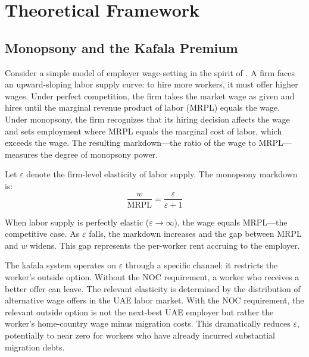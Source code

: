 \documentclass[12pt]{article}
\begin{document}

\section{Theoretical Framework}\label{sec:theory}

\subsection{Monopsony and the Kafala Premium}

Consider a simple model of employer wage-setting in the spirit of \citet{manning2003monopsony}. A firm faces an upward-sloping labor supply curve: to hire more workers, it must offer higher wages. Under perfect competition, the firm takes the market wage as given and hires until the marginal revenue product of labor (MRPL) equals the wage. Under monopsony, the firm recognizes that its hiring decision affects the wage and sets employment where MRPL equals the marginal cost of labor, which exceeds the wage. The resulting markdown---the ratio of the wage to MRPL---measures the degree of monopsony power.

Let $\varepsilon$ denote the firm-level elasticity of labor supply. The monopsony markdown is:
\begin{equation}\label{eq:markdown}
    \frac{w}{\text{MRPL}} = \frac{\varepsilon}{\varepsilon + 1}
\end{equation}

When labor supply is perfectly elastic ($\varepsilon \to \infty$), the wage equals MRPL---the competitive case. As $\varepsilon$ falls, the markdown increases and the gap between MRPL and $w$ widens. This gap represents the per-worker rent accruing to the employer.

The kafala system operates on $\varepsilon$ through a specific channel: it restricts the worker's outside option. Without the NOC requirement, a worker who receives a better offer can leave. The relevant elasticity is determined by the distribution of alternative wage offers in the UAE labor market. With the NOC requirement, the relevant outside option is not the next-best UAE employer but rather the worker's home-country wage minus migration costs. This dramatically reduces $\varepsilon$, potentially to near zero for workers who have already incurred substantial migration debts.
\end{document}
